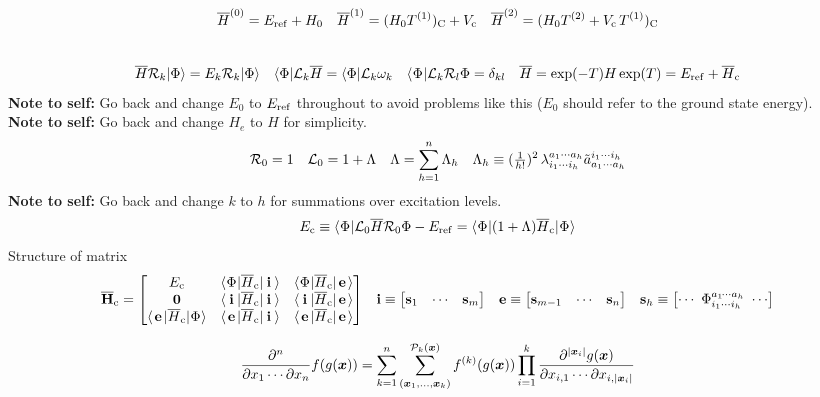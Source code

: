 \documentclass[11pt]{article}
\numberwithin{equation}{section}
\newcommand{\fwkt}[1]{\kt{\makebox[0.8em][c]{\ensuremath{#1}}}}
\newcommand{\fwbr}[1]{\br{\makebox[0.8em][c]{\ensuremath{#1}}}}
\begin{document}
\begin{align}
  \overline{H}^{(0)}
=
  E_{\mathrm{ref}}
+
  H_0
&&
  \overline{H}^{(1)}
=
  (H_0T^{(1)})_{\mathrm{C}}
+
  V_{\mathrm{c}}
&&
  \overline{H}^{(2)}
=
  (
    H_0
    T^{(2)}
  +
    V_{\mathrm{c}}\,
    T^{(1)}
  )_{\mathrm{C}}
\end{align}

\begin{align}
\end{align}

\newpage
\begin{align}
  \ol{H}
  \mc{R}_k
  \kt{\F}
=
  E_k
  \mc{R}_k
  \kt{\F}
&&
  \br{\F}
  \mc{L}_k
  \ol{H}
=
  \br{\F}
  \mc{L}_k
  \w_k
&&
  \fwbr{\F}
    \mc{L}_k
    \mc{R}_l
  {\F}
=
  \d_{kl}
&&
  \ol{H}
=
  \mr{exp}(-T)
  H\,
  \mr{exp}(T)
=
  E_\mr{ref}
+
  \ol{H}_\mr{c}
\end{align}
\textbf{Note to self:}
Go back and change $E_0$ to $E_{\mathrm{ref}}$ throughout to avoid problems like this ($E_0$ should refer to the ground state energy).\\
\textbf{Note to self:}
Go back and change $H_e$ to $H$ for simplicity.
\begin{align}
  \mathcal{R}_0
=
  1
&&
  \mathcal{L}_0
=
  1
+
  \Lambda 
&&
  \Lambda 
=
  \sum_{h=1}^n
  \Lambda _h
&&
  \Lambda _h
\equiv
  (\tfrac{1}{h!})^2\,
  \lambda _{i_1\cdots i_h}^{a_1\cdots a_h}
  \tilde{a}^{i_1\cdots i_h}_{a_1\cdots a_h}
\end{align}
\textbf{Note to self:}
Go back and change $k$ to $h$ for summations over excitation levels.
\begin{align*}
  E_\mr{c}
\equiv
  \fwbr{\F}\mc{L}_0\ol{H}\mc{R}_0{\F}
-
  E_\mr{ref}
=
  \fwbr{\F}(1+\La)\ol{H}_\mr{c}\fwkt{\F}
\end{align*}
Structure of matrix
\begin{align*}
  \ol{\bo{H}}_\mr{c}
=
\pma{
  E_\mr{c} & \fwbr{\F}\ol{H}_\mr{c}\fwkt{\bo{i}} & \fwbr{\F}\ol{H}_\mr{c}\fwkt{\bo{e}} \\
  \bo{0} & \fwbr{\bo{i}}\ol{H}_\mr{c}\fwkt{\bo{i}} & \fwbr{\bo{i}}\ol{H}_\mr{c}\fwkt{\bo{e}} \\
  \fwbr{\bo{e}}\ol{H}_\mr{c}\fwkt{\F} & \fwbr{\bo{e}}\ol{H}_\mr{c}\fwkt{\bo{i}} & \fwbr{\bo{e}}\ol{H}_\mr{c}\fwkt{\bo{e}} \\
}
&&
  \bo{i}
\equiv
\pma{
  \bo{s}_1 & \cd & \bo{s}_m
}
&&
  \bo{e}
\equiv
\pma{
  \bo{s}_{m-1} & \cd & \bo{s}_n
}
&&
  \bo{s}_h
\equiv
\pma{
  \cd
\
  \F_{i_1\cd i_h}^{a_1\hspace{-1pt}\cd a_h}
\
  \cd
}
\end{align*}


\begin{thm}
\begin{align}
  \pd{^n}{x_1\cd \pt x_n}
  f(g(\bm{x}))
=
  \sum_{k=1}^n
  \sum_{(\bm{x}_1,\ld,\bm{x}_k)}^{\mc{P}_k(\bm{x})}
  f\ord{k}(g(\bm{x}))
  \prod_{i=1}^k
  \pd{
    ^{|\bm{x}_i|}
    g(\bm{x})
  }{
    x_{i,1}
  \cd
    \pt
    x_{i,|\bm{x}_i|}
  }
\end{align}
\end{thm}
\end{document}
